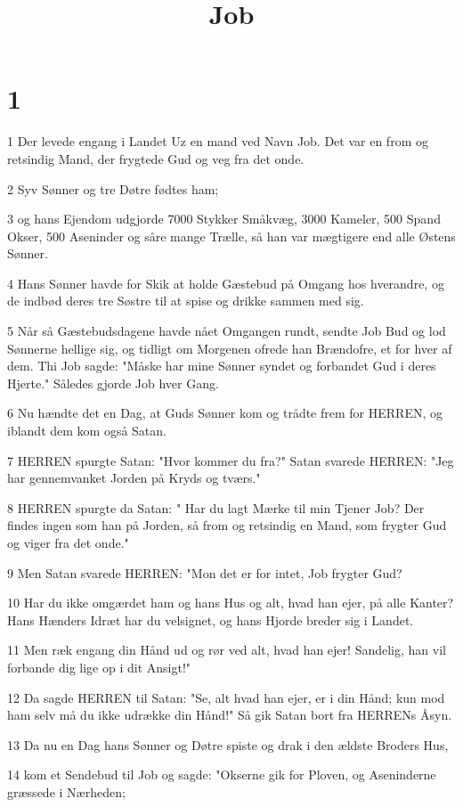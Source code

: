 

\title{Job}


\chapter{1}

\par 1 Der levede engang i Landet Uz en mand ved Navn Job. Det var en from og retsindig Mand, der frygtede Gud og veg fra det onde.
\par 2 Syv Sønner og tre Døtre fødtes ham;
\par 3 og hans Ejendom udgjorde 7000 Stykker Småkvæg, 3000 Kameler, 500 Spand Okser, 500 Aseninder og såre mange Trælle, så han var mægtigere end alle Østens Sønner.
\par 4 Hans Sønner havde for Skik at holde Gæstebud på Omgang hos hverandre, og de indbød deres tre Søstre til at spise og drikke sammen med sig.
\par 5 Når så Gæstebudsdagene havde nået Omgangen rundt, sendte Job Bud og lod Sønnerne hellige sig, og tidligt om Morgenen ofrede han Brændofre, et for hver af dem. Thi Job sagde: "Måske har mine Sønner syndet og forbandet Gud i deres Hjerte." Således gjorde Job hver Gang.
\par 6 Nu hændte det en Dag, at Guds Sønner kom og trådte frem for HERREN, og iblandt dem kom også Satan.
\par 7 HERREN spurgte Satan: "Hvor kommer du fra?" Satan svarede HERREN: "Jeg har gennemvanket Jorden på Kryds og tværs."
\par 8 HERREN spurgte da Satan: " Har du lagt Mærke til min Tjener Job? Der findes ingen som han på Jorden, så from og retsindig en Mand, som frygter Gud og viger fra det onde."
\par 9 Men Satan svarede HERREN: "Mon det er for intet, Job frygter Gud?
\par 10 Har du ikke omgærdet ham og hans Hus og alt, hvad han ejer, på alle Kanter? Hans Hænders Idræt har du velsignet, og hans Hjorde breder sig i Landet.
\par 11 Men ræk engang din Hånd ud og rør ved alt, hvad han ejer! Sandelig, han vil forbande dig lige op i dit Ansigt!"
\par 12 Da sagde HERREN til Satan: "Se, alt hvad han ejer, er i din Hånd; kun mod ham selv må du ikke udrække din Hånd!" Så gik Satan bort fra HERRENs Åsyn.
\par 13 Da nu en Dag hans Sønner og Døtre spiste og drak i den ældste Broders Hus,
\par 14 kom et Sendebud til Job og sagde: "Okserne gik for Ploven, og Aseninderne græssede i Nærheden;
